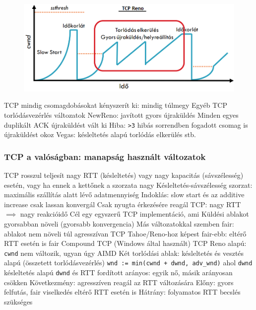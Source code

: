 \documentclass[12pt,a4paper]{article}
\begin{document}
\begin{figure}[h!]
	\centering
	\includegraphics[width=0.8\linewidth]{"TCP-Reno"}
\end{figure}

\begin{outline}
	\1 TCP mindig csomagdobásokat kényszerít ki: mindig túlmegy
	\1 Egyéb TCP torlódásvezérlés változatok
		\2 NewReno: javított gyors újraküldés
			\3 Minden egyes duplikált ACK újraküldést vált ki
			\3 Hiba: \texttt{>3} hibás sorrendben fogadott csomag is újraküldést okoz
		\2 Vegas: késleltetés alapú torlódás elkerülés
		\2 stb.
\end{outline}

\pagebreak

\subsubsection{TCP a valóságban: manapság használt változatok}

\begin{outline}
	\1 TCP rosszul teljesít nagy RTT (késleltetés) vagy nagy kapacitás (sávszélesség) esetén, vagy ha ennek a kettőnek a szorzata nagy
		\2 Késleltetés-sávszélesség szorzat: maximális szállítás alatt lévő adatmennyiség
		\2 Indoklás: slow start és az additive increase csak lassan konvergál
		\2 Csak nyugta érkezésére reagál TCP: nagy RTT $\implies$ nagy reakcióidő
	\1 Cél egy egyszerű TCP implementáció, ami
		\2 Küldési ablakot gyorsabban növeli (gyorsabb konvergencia)
		\2 Más változatokkal szemben fair: ablakot nem növeli túl agresszívan
		\2 TCP Tahoe/Reno-hoz képest fair-ebb: eltérő RTT esetén is fair
	\1 Compound TCP (Windows által használt)
		\2 TCP Reno alapú: \texttt{cwnd} nem változik, ugyan úgy AIMD
		\2 Két torlódási ablak: késleltetés és vesztés alapú (összetett torlódásvezérlés)
		\2 \texttt{wnd := min(cwnd + dwnd, adv\_wnd)} ahol \texttt{dwnd} késleltetés alapú
		\2 \texttt{dwnd} és RTT fordított arányos: egyik nő, másik arányosan csökken
		\2 Következmény: agresszíven reagál az RTT változására
		\2 Előny: gyors felfutás, fair viselkedés eltérő RTT esetén is
		\2 Hátrány: folyamatos RTT becslés szükséges 
\end{outline}
\end{document}
